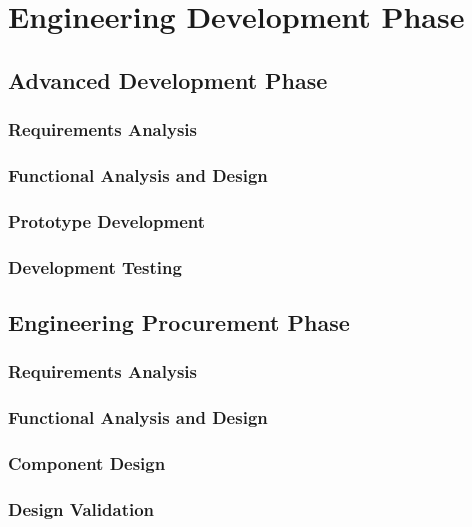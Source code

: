 \documentclass[a4paper,11pt,fleqn]{report}
\begin{document}
\chapter{Engineering Development Phase}

\section{Advanced Development Phase}

\subsection{Requirements Analysis}

\subsection{Functional Analysis and Design}

\subsection{Prototype Development}

\subsection{Development Testing}

\section{Engineering Procurement Phase}

\subsection{Requirements Analysis}

\subsection{Functional Analysis and Design}

\subsection{Component Design}

\subsection{Design Validation}
\end{document}

